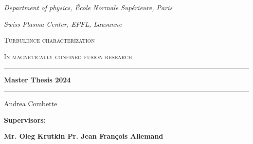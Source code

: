 \documentclass[11pt,a4paper]{report}
\author{Andrea}
\begin{document}
\begin{titlepage}
    \begin{center}
        \vspace*{2cm}
        \emph{\footnotesize{Department of physics, École Normale Supérieure, Paris}}

        \emph{\footnotesize{Swiss Plasma Center, EPFL, Lausanne}}


        \vspace*{1cm}

        \textsc{Turbulence characterization}

        \textsc{In magnetically confined fusion research}
        \vspace*{1cm}

        \rule{14cm}{2pt}\vspace{.7cm}

        \Large{\textbf{Master Thesis 2024}}

        \vspace{.5cm}
        \rule{14cm}{2pt}
        \vspace{1cm}

        \Large Andrea Combette

        \vspace{3cm}

        \raisebox{-5pt}{\quad\decofourleft\decotwo\decofourright\quad}

        \vspace{2cm}
        \vspace{1cm}

        \begin{minipage}{14cm}
            \small{\textbf{Supervisors:}}
            \vspace{.5cm}

            \small{\textbf{Mr. Oleg Krutkin \null\hfill Pr. Jean François Allemand}}

        \end{minipage}
        \vspace{2cm}



\end{center}
\end{titlepage}
\end{document}
